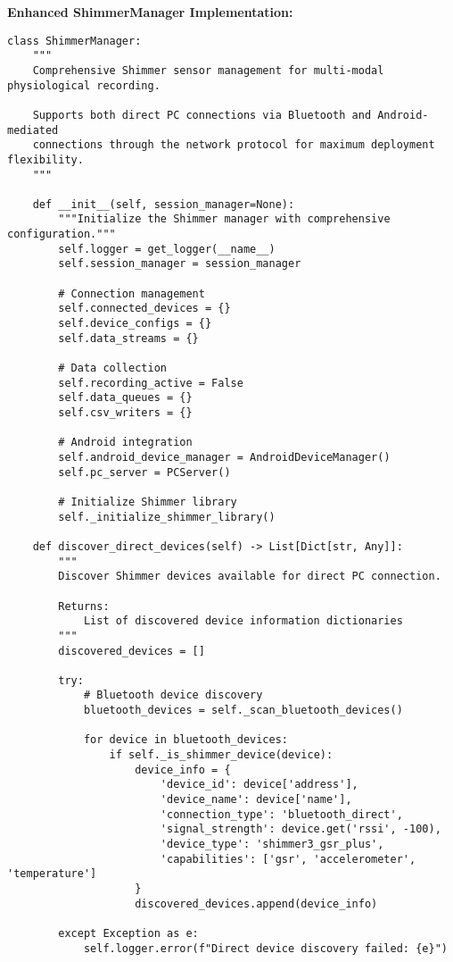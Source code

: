 \documentclass[11pt,a4paper]{article}
\begin{document}
\textbf{Enhanced ShimmerManager Implementation:}

\begin{verbatim}
class ShimmerManager:
    """
    Comprehensive Shimmer sensor management for multi-modal physiological recording.

    Supports both direct PC connections via Bluetooth and Android-mediated
    connections through the network protocol for maximum deployment flexibility.
    """

    def __init__(self, session_manager=None):
        """Initialize the Shimmer manager with comprehensive configuration."""
        self.logger = get_logger(__name__)
        self.session_manager = session_manager

        # Connection management
        self.connected_devices = {}
        self.device_configs = {}
        self.data_streams = {}

        # Data collection
        self.recording_active = False
        self.data_queues = {}
        self.csv_writers = {}

        # Android integration
        self.android_device_manager = AndroidDeviceManager()
        self.pc_server = PCServer()

        # Initialize Shimmer library
        self._initialize_shimmer_library()

    def discover_direct_devices(self) -> List[Dict[str, Any]]:
        """
        Discover Shimmer devices available for direct PC connection.

        Returns:
            List of discovered device information dictionaries
        """
        discovered_devices = []

        try:
            # Bluetooth device discovery
            bluetooth_devices = self._scan_bluetooth_devices()

            for device in bluetooth_devices:
                if self._is_shimmer_device(device):
                    device_info = {
                        'device_id': device['address'],
                        'device_name': device['name'],
                        'connection_type': 'bluetooth_direct',
                        'signal_strength': device.get('rssi', -100),
                        'device_type': 'shimmer3_gsr_plus',
                        'capabilities': ['gsr', 'accelerometer', 'temperature']
                    }
                    discovered_devices.append(device_info)

        except Exception as e:
            self.logger.error(f"Direct device discovery failed: {e}")


\end{verbatim}
\end{document}
